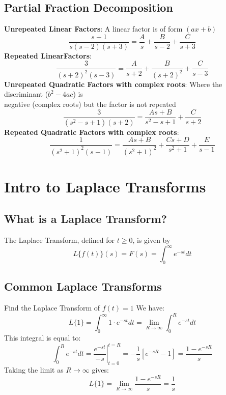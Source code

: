 \documentclass[a4paper, 10pt]{article}
\begin{document}
\subsection{Partial Fraction Decomposition}
\textbf{Unrepeated Linear Factors}: A linear factor is of form $(ax + b)$
$$\frac{s + 1}{s(s-2)(s+3)} = \frac{A}{s} + \frac{B}{s-2} + \frac{C}{s+3}$$
\textbf{Repeated LinearFactors}:
$$\frac{3}{(s+2)^2(s-3)} = \frac{A}{s+2} + \frac{B}{(s+2)^2} + \frac{C}{s-3}$$
\textbf{Unrepeated Quadratic Factors with complex roots}: Where the discriminant ($b^2 - 4ac$) is \\
\indent negative (complex roots) but the factor is not repeated
$$\frac{3}{(s^2 - s + 1)(s+2)} = \frac{As + B}{s^2 - s + 1} + \frac{C}{s+2}$$
\textbf{Repeated Quadratic Factors with complex roots}:
$$\frac{1}{(s^2 + 1)^2 (s-1)} = \frac{As + B}{(s^2 + 1)^2} + \frac{Cs + D}{s^2 + 1} + \frac{E}{s-1}$$


\pagebreak
\section{Intro to Laplace Transforms}
\subsection{What is a Laplace Transform?}
\begin{definitionbox}{}{}
  The Laplace Transform, defined for $t \geq 0$, is given by
  $$L\{f(t)\}(s) = F(s) = \int_0^\infty e^{-st} dt$$

\end{definitionbox}

\subsection{Common Laplace Transforms}

\begin{examplebox}{Find the Laplace Transform of \boldmath$f(t) = 1$}{}
  We have:
  $$L\{1\} = \int_0^\infty 1 \cdot e^{-st } dt = \lim_{R \to \infty} \int_0^R e^{-st} dt$$
  This integral is equal to:
  $$\int_0^R e^{-st} dt = \left . \frac{e^{-st}}{-s}\right |_{t=0}^{t=R}
    = -\frac{1}{s}[e^{-sR} - 1] = \frac{1 - e^{-sR}}{s}$$
  Taking the limit as $R \to \infty$ gives:
  $$L\{1\} = \lim_{R \to \infty} \frac{1 - e^{-sR}}{s} = \frac{1}{s}$$
\end{examplebox}
\end{document}
